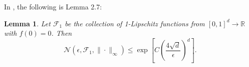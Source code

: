 \documentclass[12pt]{article}
\newcommand{\RR}{\mathbb{R}}
\newtheorem{lemma}{Lemma}
\theoremstyle{definition}
\begin{document}




In \cite{chewi2025statistical}, the following is Lemma 2.7:
\begin{lemma}
\label{lem:f1coveringnumber}
    Let $\mathcal{F}_1$ be the collection of 1-Lipschitz functions from $[0,1]^d\rightarrow\RR$ with $f(0)=0$. Then $$\mathcal{N}(\epsilon,\mathcal{F}_1,\|\cdot\|_{\infty})\leq \exp\left[C\left(\frac{4\sqrt{d}}{\epsilon}\right)^d\right].$$
\end{lemma}
\end{document}
